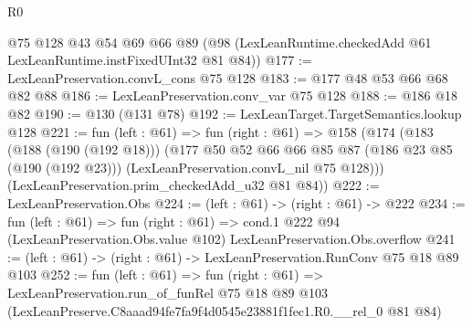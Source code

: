 \begin{lexlean}{R0}
\begin{coremodule}
    @75
    @128
    @43
    @54
    @69
    @66
    @89
    (@98 (LexLeanRuntime.checkedAdd @61 LexLeanRuntime.instFixedUInt32 @81 @84))
@177 := LexLeanPreservation.convL_cons @75 @128
@183 := @177 @48 @53 @66 @68 @82 @88
@186 := LexLeanPreservation.conv_var @75 @128
@188 := @186 @18 @82
@190 := @130 (@131 @78)
@192 := LexLeanTarget.TargetSemantics.lookup @128
@221 := fun (left : @61) =>
  fun (right : @61) =>
  @158
    (@174
      (@183
        (@188 (@190 (@192 @18)))
        (@177
          @50
          @52
          @66
          @66
          @85
          @87
          (@186 @23 @85 (@190 (@192 @23)))
          (LexLeanPreservation.convL_nil @75 @128)))
      (LexLeanPreservation.prim_checkedAdd_u32 @81 @84))
@222 := LexLeanPreservation.Obs
@224 := (left : @61) -> (right : @61) -> @222
@234 := fun (left : @61) =>
  fun (right : @61) =>
  cond.{1} @222 @94 (LexLeanPreservation.Obs.value @102) LexLeanPreservation.Obs.overflow
@241 := (left : @61) -> (right : @61) -> LexLeanPreservation.RunConv @75 @18 @89 @103
@252 := fun (left : @61) =>
  fun (right : @61) =>
  LexLeanPreservation.run_of_funRel
    @75
    @18
    @89
    @103
    (LexLeanPreserve.C8aaad94fe7fa9f4d0545e23881f1fec1.R0.__rel_0 @81 @84)
\end{coremodule}
\end{lexlean}
